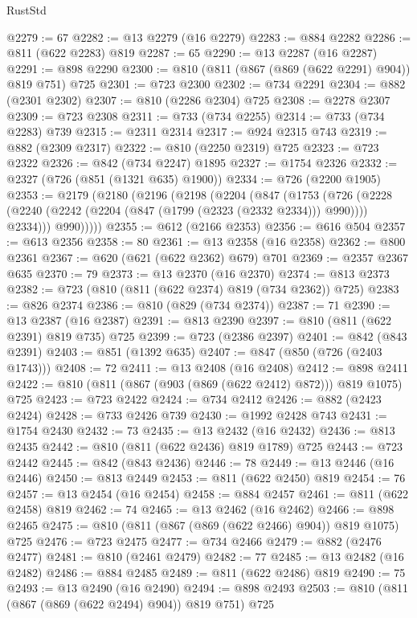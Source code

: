 \begin{lexlean}{RustStd}
\begin{coremodule}
@2279 := 67
@2282 := @13 @2279 (@16 @2279)
@2283 := @884 @2282
@2286 := @811 (@622 @2283) @819
@2287 := 65
@2290 := @13 @2287 (@16 @2287)
@2291 := @898 @2290
@2300 := @810 (@811 (@867 (@869 (@622 @2291) @904)) @819 @751) @725
@2301 := @723 @2300
@2302 := @734 @2291
@2304 := @882 (@2301 @2302)
@2307 := @810 (@2286 @2304) @725
@2308 := @2278 @2307
@2309 := @723 @2308
@2311 := @733 (@734 @2255)
@2314 := @733 (@734 @2283) @739
@2315 := @2311 @2314
@2317 := @924 @2315 @743
@2319 := @882 (@2309 @2317)
@2322 := @810 (@2250 @2319) @725
@2323 := @723 @2322
@2326 := @842 (@734 @2247) @1895
@2327 := @1754 @2326
@2332 := @2327 (@726 (@851 (@1321 @635) @1900))
@2334 := @726 (@2200 @1905)
@2353 := @2179
    (@2180
      (@2196
        (@2198
          (@2204
            (@847
              (@1753
                (@726
                  (@2228 (@2240 (@2242 (@2204 (@847 (@1799 (@2323 (@2332 @2334))) @990)))) @2334)))
              @990)))))
@2355 := @612 (@2166 @2353)
@2356 := @616 @504
@2357 := @613 @2356
@2358 := 80
@2361 := @13 @2358 (@16 @2358)
@2362 := @800 @2361
@2367 := @620 (@621 (@622 @2362) @679) @701
@2369 := @2357 @2367 @635
@2370 := 79
@2373 := @13 @2370 (@16 @2370)
@2374 := @813 @2373
@2382 := @723 (@810 (@811 (@622 @2374) @819 (@734 @2362)) @725)
@2383 := @826 @2374
@2386 := @810 (@829 (@734 @2374))
@2387 := 71
@2390 := @13 @2387 (@16 @2387)
@2391 := @813 @2390
@2397 := @810 (@811 (@622 @2391) @819 @735) @725
@2399 := @723 (@2386 @2397)
@2401 := @842 (@843 @2391)
@2403 := @851 (@1392 @635)
@2407 := @847 (@850 (@726 (@2403 @1743)))
@2408 := 72
@2411 := @13 @2408 (@16 @2408)
@2412 := @898 @2411
@2422 := @810 (@811 (@867 (@903 (@869 (@622 @2412) @872))) @819 @1075) @725
@2423 := @723 @2422
@2424 := @734 @2412
@2426 := @882 (@2423 @2424)
@2428 := @733 @2426 @739
@2430 := @1992 @2428 @743
@2431 := @1754 @2430
@2432 := 73
@2435 := @13 @2432 (@16 @2432)
@2436 := @813 @2435
@2442 := @810 (@811 (@622 @2436) @819 @1789) @725
@2443 := @723 @2442
@2445 := @842 (@843 @2436)
@2446 := 78
@2449 := @13 @2446 (@16 @2446)
@2450 := @813 @2449
@2453 := @811 (@622 @2450) @819
@2454 := 76
@2457 := @13 @2454 (@16 @2454)
@2458 := @884 @2457
@2461 := @811 (@622 @2458) @819
@2462 := 74
@2465 := @13 @2462 (@16 @2462)
@2466 := @898 @2465
@2475 := @810 (@811 (@867 (@869 (@622 @2466) @904)) @819 @1075) @725
@2476 := @723 @2475
@2477 := @734 @2466
@2479 := @882 (@2476 @2477)
@2481 := @810 (@2461 @2479)
@2482 := 77
@2485 := @13 @2482 (@16 @2482)
@2486 := @884 @2485
@2489 := @811 (@622 @2486) @819
@2490 := 75
@2493 := @13 @2490 (@16 @2490)
@2494 := @898 @2493
@2503 := @810 (@811 (@867 (@869 (@622 @2494) @904)) @819 @751) @725

\end{coremodule}
\end{lexlean}
